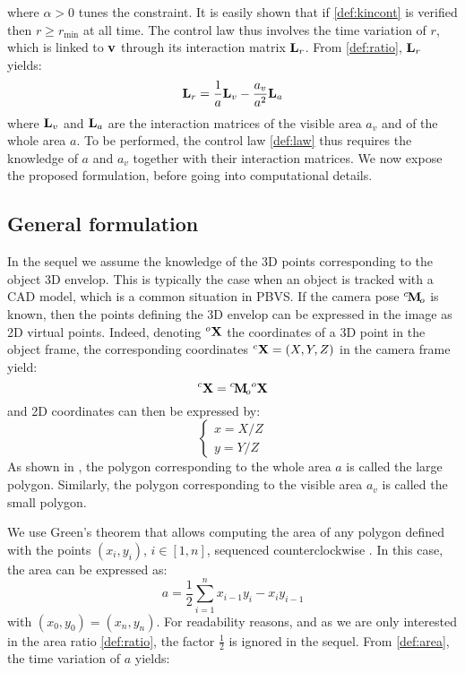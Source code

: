 \documentclass[letterpaper, 10 pt, conference]{IEEEtran}  %
\begin{document}
where $\alpha>0$ tunes the constraint. It is easily shown that if \eqref{def:kincont} is verified then $r \geq r_{\text{min}}$ at all time.
The control law thus involves the time variation of $r$, which is linked to $\mathbf{v}$ through its interaction matrix $\mathbf{L}_r$.
From \eqref{def:ratio}, $\mathbf{L}_r$ yields:
\begin{equation}\label{def:Lr}
\L_r = \frac{1}{a}\L_v - \frac{a_v}{a^2}\L_a
\end{equation}where $\mathbf{L}_v$ and $\mathbf{L}_a$ are the interaction matrices of the visible area $a_v$ and of the whole area $a$.
To be performed, the control law \eqref{def:law} thus requires the knowledge of $a$ and $a_v$ together with their interaction matrices.
We now expose the proposed formulation, before going into computational details.



\subsection{General formulation}

In the sequel we assume the knowledge of the 3D points corresponding to the object 3D envelop. This is typically the case when an object is tracked with a CAD model, which is a common situation in PBVS.
If the camera pose $\cMo$ is known, then the points defining the 3D envelop can be expressed in the image as 2D virtual points.
Indeed, denoting ${}^o\mathbf{X}$ the coordinates of a 3D point in the object frame, the corresponding coordinates ${}^c\mathbf{X}=(X,Y,Z)$ in the camera frame yield:
\begin{equation}
{}^c\X = \cMo{}^o\X
\end{equation}
and 2D coordinates can then be expressed by:
\begin{equation}\label{def:projection}
\left\{\begin{array}{l}
x = X/Z \\
y = Y/Z
\end{array}\right.
\end{equation}
As shown in , the polygon corresponding to the whole area $a$ is called the large polygon. Similarly, the polygon corresponding to the visible area $a_v$ is called the small polygon.

We use Green's theorem that allows computing the area of any polygon defined with the points $(x_i,y_i)$, $i\in[1,n]$, sequenced counterclockwise \cite{steger1996calculation}.
In this case, the area can be expressed as:
\begin{equation}\label{def:area}
a = \frac{1}{2}\sum_{i=1}^{n}{x_{i-1} y_i - x_i y_{i-1}}
\end{equation}with $(x_0,y_0) = (x_n,y_n)$. For readability reasons, and as we are only interested in the area ratio \eqref{def:ratio}, the factor $\frac{1}{2}$ is ignored in the sequel.
From \eqref{def:area}, the time variation of $a$ yields:
\end{document}
